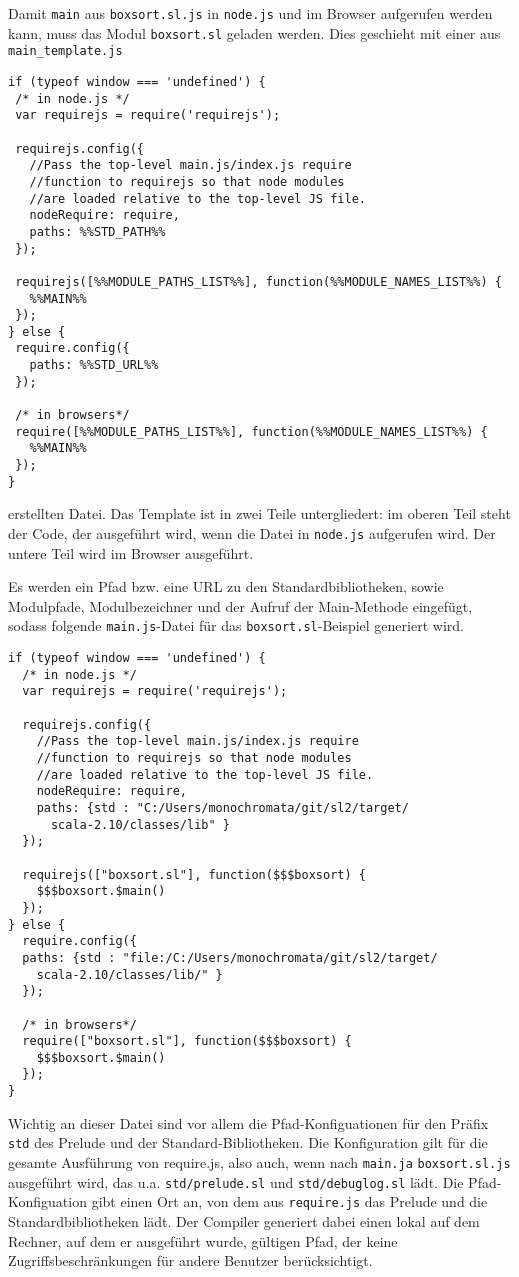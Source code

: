 \documentclass[runningheads]{llncs}
\begin{document}
Damit \texttt{main} aus \texttt{boxsort.sl.js} in \texttt{node.js} und
im Browser aufgerufen werden kann, muss das Modul \texttt{boxsort.sl}
geladen werden. Dies geschieht mit einer aus \texttt{main\_template.js}

\begin{verbatim}
if (typeof window === 'undefined') {
 /* in node.js */
 var requirejs = require('requirejs');

 requirejs.config({
   //Pass the top-level main.js/index.js require
   //function to requirejs so that node modules
   //are loaded relative to the top-level JS file.
   nodeRequire: require,
   paths: %%STD_PATH%%
 });

 requirejs([%%MODULE_PATHS_LIST%%], function(%%MODULE_NAMES_LIST%%) {
   %%MAIN%%
 });
} else {
 require.config({
   paths: %%STD_URL%%
 });

 /* in browsers*/ 
 require([%%MODULE_PATHS_LIST%%], function(%%MODULE_NAMES_LIST%%) {
   %%MAIN%%
 });
}
\end{verbatim}

erstellten Datei. Das Template ist in zwei Teile untergliedert: im oberen Teil steht
der Code, der ausgeführt wird, wenn die Datei in \texttt{node.js}
aufgerufen wird. Der untere Teil wird im Browser ausgeführt.

Es werden ein Pfad bzw. eine URL zu den Standardbibliotheken, sowie
Modulpfade, Modulbezeichner und der Aufruf der Main-Methode eingefügt,
sodass folgende \texttt{main.js}-Datei für das
\texttt{boxsort.sl}-Beispiel generiert wird.

\begin{verbatim}
if (typeof window === 'undefined') {
  /* in node.js */
  var requirejs = require('requirejs');

  requirejs.config({
    //Pass the top-level main.js/index.js require
    //function to requirejs so that node modules
    //are loaded relative to the top-level JS file.
    nodeRequire: require,
    paths: {std : "C:/Users/monochromata/git/sl2/target/
      scala-2.10/classes/lib" }
  });

  requirejs(["boxsort.sl"], function($$$boxsort) {
    $$$boxsort.$main()
  });
} else {
  require.config({
  paths: {std : "file:/C:/Users/monochromata/git/sl2/target/
    scala-2.10/classes/lib/" }
  });

  /* in browsers*/ 
  require(["boxsort.sl"], function($$$boxsort) {
    $$$boxsort.$main()
  });
}
\end{verbatim}

Wichtig an dieser Datei sind vor allem die Pfad-Konfiguationen für
den Präfix \texttt{std} des Prelude und der Standard-Bibliotheken.
Die Konfiguration gilt für die gesamte Ausführung von require.js, also
auch, wenn nach \texttt{main.ja} \texttt{boxsort.sl.js} ausgeführt wird, das u.a.
\texttt{std/prelude.sl} und \texttt{std/debuglog.sl} lädt. Die
Pfad-Konfiguation gibt einen Ort an, von dem aus \texttt{require.js}
das Prelude und die Standardbibliotheken lädt. Der Compiler generiert
dabei einen lokal auf dem Rechner, auf dem er ausgeführt wurde,
gültigen Pfad, der keine Zugriffsbeschränkungen für andere Benutzer
berücksichtigt.
\end{document}
